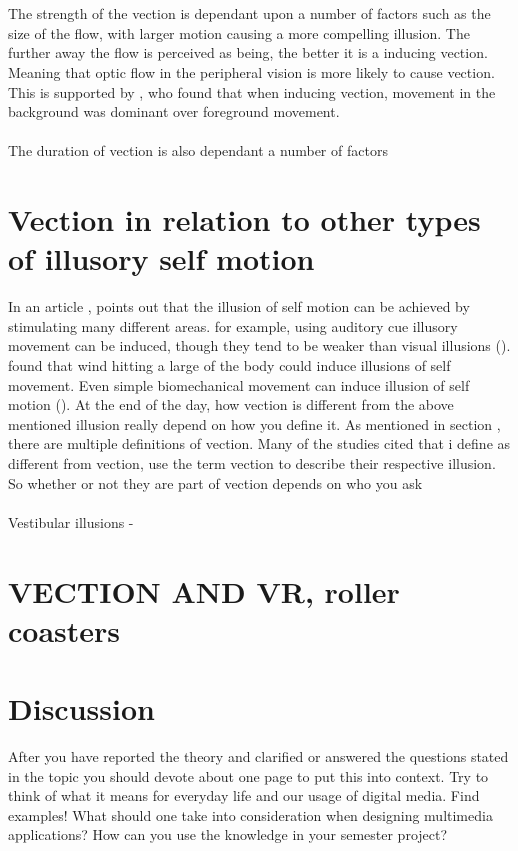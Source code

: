 \documentclass[11pt,a4paper,oneside,table,xcdraw]{article}
\begin{document}
\\\\
The strength of the vection is dependant upon a number of factors such as the size of the flow, with larger motion causing a more compelling illusion. The further away the flow is perceived as being, the better it is a inducing vection. Meaning that optic flow in the peripheral vision is more likely to cause vection. This is supported by \cite{vection}, who found that when inducing vection, movement in the background was dominant over foreground movement.\\\\
The duration of vection is also dependant a number of factors   
\section{Vection in relation to other types of illusory self motion}
In an article \cite{challenges}, points out that the illusion of self motion can be achieved by stimulating many different areas. for example, using auditory cue illusory movement can be induced, though they tend to be weaker than visual illusions (\cite{auditory, movement}). \cite{wind} found that wind hitting a large of the body could induce illusions of self movement. Even simple biomechanical movement can induce illusion of self motion (\cite{movement,challenges}). At the end of the day, how vection is different from the above mentioned illusion really depend on how you define it. As mentioned in section , there are multiple definitions of vection. Many of the studies cited that i define as different from vection, use the term vection to describe their respective illusion. So whether or not they are part of vection depends on who you ask\\\\
Vestibular illusions -
\section{VECTION AND VR, roller coasters}



\section{Discussion}
After you have reported the theory and clarified or answered the questions stated in
the topic you should devote about one page to put this into context. Try to think of
what it means for everyday life and our usage of digital media. Find examples! What
should one take into consideration when designing multimedia applications? How can
you use the knowledge in your semester project?



\end{document}
